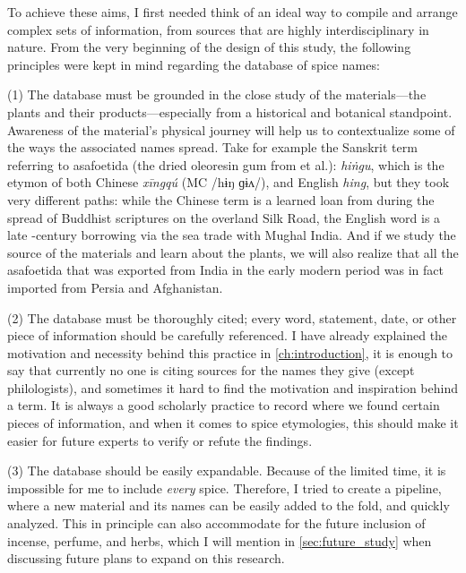 To achieve these aims, I first needed think of an ideal way to compile and arrange complex sets of information, from sources that are highly interdisciplinary in nature. From the very beginning of the design of this study, the following principles were kept in mind regarding the database of spice names:

(1) The database must be grounded in the close study of the materials---the plants and their products---especially from a historical and botanical standpoint. Awareness of the material's physical journey will help us to contextualize some of the ways the associated names spread. Take for example the Sanskrit term referring to asafoetida (the dried oleoresin gum from  et al.):  \textit{hiṅgu}, which is the etymon of both Chinese  \textit{xīngqú} (\gls{MC} /hɨŋ ɡɨʌ/),
and English \textit{hing}, but they took very different paths: while the Chinese term is a learned loan from during the spread of Buddhist scriptures on the overland Silk Road, the English word is a late -century borrowing via the sea trade with Mughal India. And if we study the source of the materials and learn about the plants, we will also realize that all the asafoetida that was exported from India in the early modern period was in fact imported from Persia and Afghanistan.

(2) The database must be thoroughly cited; every word, statement, date, or other piece of information should be carefully referenced. I have already explained the motivation and necessity behind this practice in \cref{ch:introduction}, it is enough to say that currently no one is citing sources for the names they give (except philologists), and sometimes it hard to find the motivation and inspiration behind a term. It is always a good scholarly practice to record where we found certain pieces of information, and when it comes to spice etymologies, this should make it easier for future experts to verify or refute the findings.

(3) The database should be easily expandable. Because of the limited time, it is impossible for me to include \emph{every} spice. Therefore, I tried to create a pipeline, where a new material and its names can be easily added to the fold, and quickly analyzed. This in principle can also accommodate for the future inclusion of incense, perfume, and herbs, which I will mention in \cref{sec:future_study} when discussing future plans to expand on this research.

